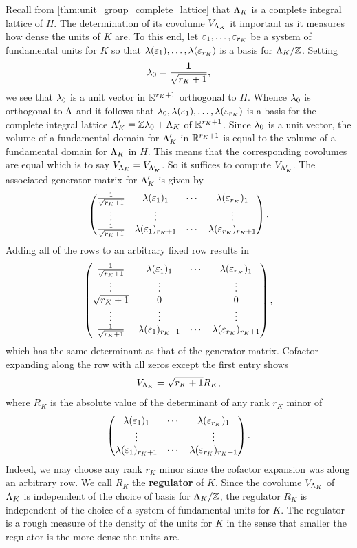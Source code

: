     Recall from \cref{thm:unit_group_complete_lattice} that \(\Lambda_{K}\) is a complete integral lattice of \(H\). The determination of its covolume \(V_{\Lambda_{K}}\) it important as it measures how dense the units of \(K\) are. To this end, let \(\varepsilon_{1},\ldots,\varepsilon_{r_{K}}\) be a system of fundamental units for \(K\) so that \(\lambda(\varepsilon_{1}),\ldots,\lambda(\varepsilon_{r_{K}})\) is a basis for \(\Lambda_{K}/\mathbb{Z}\). Setting
    \[
      \lambda_{0} = \frac{\mathbf{1}}{\sqrt{r_{K}+1}},
    \]
    we see that \(\lambda_{0}\) is a unit vector in \(\mathbb{R}^{r_{K}+1}\) orthogonal to \(H\). Whence \(\lambda_{0}\) is orthogonal to \(\Lambda\) and it follows that \(\lambda_{0},\lambda(\varepsilon_{1}),\ldots,\lambda(\varepsilon_{r_{K}})\) is a basis for the complete integral lattice \(\Lambda_{K}' = \mathbb{Z}\lambda_{0}+\Lambda_{K}\) of \(\mathbb{R}^{r_{K}+1}\). Since \(\lambda_{0}\) is a unit vector, the volume of a fundamental domain for \(\Lambda_{K}'\) in \(\mathbb{R}^{r_{K}+1}\) is equal to the volume of a fundamental domain for \(\Lambda_{K}\) in \(H\). This means that the corresponding covolumes are equal which is to say \(V_{\Lambda_{K}} = V_{\Lambda_{K}'}\). So it suffices to compute \(V_{\Lambda_{K}'}\). The associated generator matrix for \(\Lambda_{K}'\) is given by
    \[
      \begin{pmatrix} \frac{1}{\sqrt{r_{K}+1}} & \lambda(\varepsilon_{1})_{1} & \cdots & \lambda(\varepsilon_{r_{K}})_{1} \\ \vdots & \vdots & & \vdots \\ \frac{1}{\sqrt{r_{K}+1}} & \lambda(\varepsilon_{1})_{r_{K}+1} & \cdots & \lambda(\varepsilon_{r_{K}})_{r_{K}+1} \end{pmatrix}.
    \]
    Adding all of the rows to an arbitrary fixed row results in
    \[
      \begin{pmatrix} \frac{1}{\sqrt{r_{K}+1}} & \lambda(\varepsilon_{1})_{1} & \cdots & \lambda(\varepsilon_{r_{K}})_{1} \\ \vdots & \vdots & & \vdots \\ \sqrt{r_{K}+1} & 0 & & 0 \\ \vdots & \vdots & & \vdots \\ \frac{1}{\sqrt{r_{K}+1}} & \lambda(\varepsilon_{1})_{r_{K}+1} & \cdots & \lambda(\varepsilon_{r_{K}})_{r_{K}+1} \end{pmatrix},
    \]
    which has the same determinant as that of the generator matrix. Cofactor expanding along the row with all zeros except the first entry shows
    \[
      V_{\Lambda_{K}} = \sqrt{r_{K}+1}R_{K},
    \]
    where \(R_{K}\) is the absolute value of the determinant of any rank \(r_{K}\) minor of
    \[
      \begin{pmatrix} \lambda(\varepsilon_{1})_{1} & \cdots & \lambda(\varepsilon_{r_{K}})_{1} \\ \vdots & & \vdots \\ \lambda(\varepsilon_{1})_{r_{K}+1} & \cdots & \lambda(\varepsilon_{r_{K}})_{r_{K}+1}  \end{pmatrix}.
    \]
    Indeed, we may choose any rank \(r_{K}\) minor since the cofactor expansion was along an arbitrary row. We call \(R_{K}\) the \textbf{regulator} of \(K\). Since the covolume \(V_{\Lambda_{K}}\) of \(\Lambda_{K}\) is independent of the choice of basis for \(\Lambda_{K}/\mathbb{Z}\), the regulator \(R_{K}\) is independent of the choice of a system of fundamental units for \(K\). The regulator is a rough measure of the density of the units for \(K\) in the sense that smaller the regulator is the more dense the units are.


